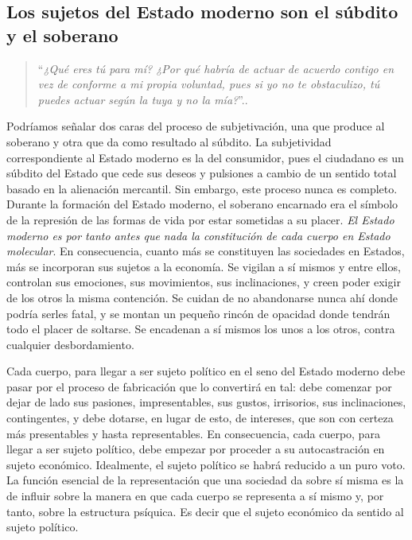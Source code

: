 \subsection{Los sujetos del Estado moderno son el súbdito y el soberano}
\label{sub:los-sujetos-del-estado-moderno-son-el-súdito-y-el-soberano}

\begin{quote}
  \enquote{\emph{¿Qué eres tú para mí? ¿Por qué habría de actuar de acuerdo contigo en vez de conforme a mi propia voluntad, pues si yo no te obstaculizo, tú puedes actuar según la tuya y no la mía?}}.\autocite[p.~63]{hobbesCiveElementosFilosoficos2016}. 
\end{quote}

Podríamos señalar dos caras del proceso de subjetivación, una que produce al soberano y otra que da como resultado al súbdito. La subjetividad correspondiente al Estado moderno es la del consumidor, pues el ciudadano es un súbdito del Estado que cede sus deseos y pulsiones a cambio de un sentido total basado en la alienación mercantil. Sin embargo, este proceso nunca es completo. Durante la formación del Estado moderno, el soberano encarnado era el símbolo de la represión de las formas de vida por estar sometidas a su placer. \emph{El Estado moderno es por tanto antes que nada la constitución de cada cuerpo en Estado molecular}. En consecuencia, cuanto más se constituyen las sociedades en Estados, más se incorporan sus sujetos a la economía. Se vigilan a sí mismos y entre ellos, controlan sus emociones, sus movimientos, sus inclinaciones, y creen poder exigir de los otros la misma contención. Se cuidan de no abandonarse nunca ahí donde podría serles fatal, y se montan un pequeño rincón de opacidad donde tendrán todo el placer de soltarse. Se encadenan a sí mismos los unos a los otros, contra cualquier desbordamiento.

Cada cuerpo, para llegar a ser sujeto político en el seno del Estado moderno debe pasar por el proceso de fabricación que lo convertirá en tal: debe comenzar por dejar de lado sus pasiones, impresentables, sus gustos, irrisorios, sus inclinaciones, contingentes, y debe dotarse, en lugar de esto, de intereses, que son con certeza más presentables y hasta representables. En consecuencia, cada cuerpo, para llegar a ser sujeto político, debe empezar por proceder a su autocastración en sujeto económico. Idealmente, el sujeto político se habrá reducido a un puro voto. La función esencial de la representación que una sociedad da sobre sí misma es la de influir sobre la manera en que cada cuerpo se representa a sí mismo y, por tanto, sobre la estructura psíquica. Es decir que el sujeto económico da sentido al sujeto político.

